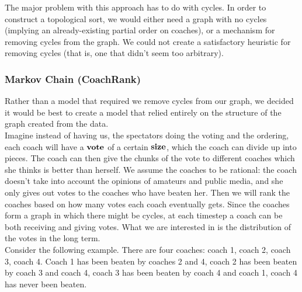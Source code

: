 \documentclass[titlepage,11pt]{article}
\begin{document}
\noindent The major problem with this approach has to do with cycles. In order to construct a topological sort, we would either need a graph with no cycles (implying an already-existing partial order on coaches), or a mechanism for removing cycles from the graph. We could not create a satisfactory heuristic for removing cycles (that is, one that didn't seem too arbitrary).

\subsubsection{Markov Chain (CoachRank)}
Rather than a model that required we remove cycles from our graph, we decided it would be best to create a model that relied entirely on the structure of the graph created from the data.
\\

\noindent Imagine instead of having us, the spectators doing the voting and the ordering, each coach will have a $\bf{vote}$ of a certain $\bf{size}$, which the coach can divide up into pieces. The coach can then give the chunks of the vote to different coaches which she thinks is better than herself. We assume the coaches to be rational: the coach doesn't take into account the opinions of amateurs and public media, and she only gives out votes to the coaches who have beaten her. Then we will rank the coaches based on how many votes each coach eventually gets. Since the coaches form a graph in which there might be cycles, at each timestep a coach can be both receiving and giving votes. What we are interested in is the distribution of the votes in the long term.
\\

\noindent Consider the following example. There are four coaches: coach 1, coach 2, coach 3, coach 4. Coach 1 has been beaten by coaches 2 and 4, coach 2 has been beaten by coach 3 and coach 4, coach 3 has been beaten by coach 4 and coach 1, coach 4 has never been beaten.
\end{document}
